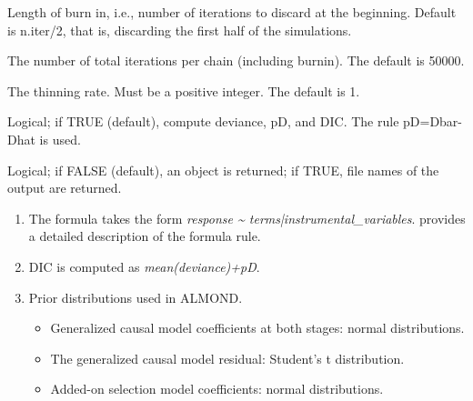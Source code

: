 \documentclass[a4paper]{book}
\begin{document}
\begin{Arguments}
\begin{ldescription}
\item[\code{n.burnin}] Length of burn in, i.e., number of iterations to discard at the beginning.
Default is n.iter/2, that is, discarding the first half of the simulations.

\item[\code{n.iter}] The number of total iterations per chain (including burnin). The default is 50000.

\item[\code{n.thin}] The thinning rate. Must be a positive integer. The default is 1.

\item[\code{DIC}] Logical; if TRUE (default), compute deviance, pD, and DIC. The rule pD=Dbar-Dhat is used.

\item[\code{codaPkg}] Logical; if FALSE (default), an object is returned; if TRUE,
file names of the output are returned.
\end{ldescription}
\end{Arguments}
%
\begin{Details}\relax
\begin{enumerate}

\item The formula takes the form \emph{response \textasciitilde{} terms|instrumental\_variables}.
 provides a detailed description of the formula rule.
\item DIC is computed as \emph{mean(deviance)+pD}.
\item Prior distributions used in ALMOND.
\begin{itemize}

\item Generalized causal model coefficients at both stages: normal distributions.
\item The generalized causal model residual: Student's t distribution.
\item Added-on selection model coefficients: normal distributions.

\end{itemize}


\end{enumerate}

\end{Details}
%
\end{document}
